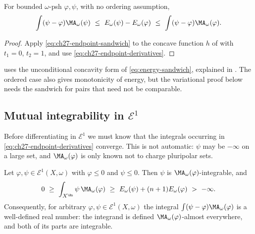 \begin{corollary}
\label{cor:ch27-bounded-sandwich}
For bounded $\omega$-psh $\varphi,\psi$, with no ordering assumption,
\begin{equation}\label{eq:ch27-bounded-two-sided}
 \int(\psi-\varphi)\MA_\omega(\psi)
 \ \leq\ E_\omega(\psi)-E_\omega(\varphi)
 \ \leq\ \int(\psi-\varphi)\MA_\omega(\varphi).
\end{equation}
\end{corollary}

\begin{proof}
Apply \eqref{eq:ch27-endpoint-sandwich} to the concave function $h$ of
 with $t_1=0$, $t_2=1$, and use
\eqref{eq:ch27-endpoint-derivatives}.
\end{proof}

 uses the unconditional concavity form of
\eqref{eq:energy-sandwich}, explained in .
The ordered case also gives monotonicity of energy, but the variational
proof below needs the sandwich for pairs that need not be comparable.

\subsection{Mutual integrability in \texorpdfstring{$\mathcal E^1$}{E1}}
\label{sec:ch27-mutual-integrability}

Before differentiating in $\mathcal E^1$ we must know that the integrals
occurring in \eqref{eq:ch27-endpoint-derivatives} converge.  This is not
automatic: $\psi$ may be $-\infty$ on a large set, and
$\MA_\omega(\varphi)$ is only known not to charge pluripolar sets.

\begin{lemma}
\label{lem:ch27-mutual-integrability}
Let $\varphi,\psi\in\mathcal E^1(X,\omega)$ with $\varphi\leq0$ and
$\psi\leq0$.  Then $\psi$ is $\MA_\omega(\varphi)$-integrable, and
\begin{equation}\label{eq:ch27-mutual-integrability}
 0\ \geq\ \int_{X^{\An}}\psi\,\MA_\omega(\varphi)
   \ \geq\ E_\omega(\psi)+(n+1)E_\omega(\varphi)\ >\ -\infty .
\end{equation}
Consequently, for arbitrary $\varphi,\psi\in\mathcal E^1(X,\omega)$ the
integral $\int(\psi-\varphi)\MA_\omega(\varphi)$ is a well-defined real
number: the integrand is defined $\MA_\omega(\varphi)$-almost everywhere,
and both of its parts are integrable.
\end{lemma}

